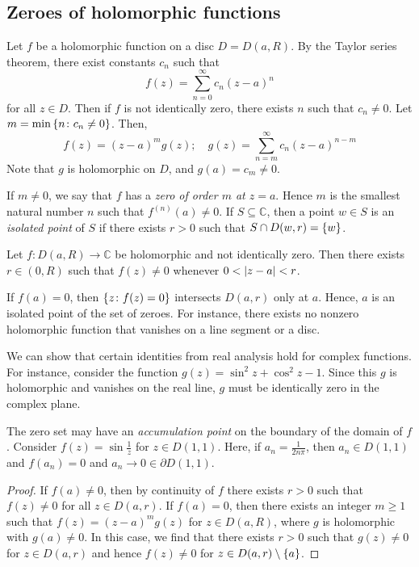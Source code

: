 \subsection{Zeroes of holomorphic functions}
\begin{definition}
	Let \( f \) be a holomorphic function on a disc \( D = D(a,R) \).
	By the Taylor series theorem, there exist constants \( c_n \) such that
	\[
		f(z) = \sum_{n=0}^\infty c_n (z-a)^n
	\]
	for all \( z \in D \).
	Then if \( f \) is not identically zero, there exists \( n \) such that \( c_n \neq 0 \).
	Let \( m = \min \qty{ n \colon c_n \neq 0 } \).
	Then,
	\[
		f(z) = (z-a)^m g(z);\quad g(z) = \sum_{n=m}^\infty c_n (z-a)^{n-m}
	\]
	Note that \( g \) is holomorphic on \( D \), and \( g(a) = c_m \neq 0 \).

	If \( m \neq 0 \), we say that \( f \) has a \textit{zero of order \( m \) at \( z = a \)}.
	Hence \( m \) is the smallest natural number \( n \) such that \( f^{(n)}(a) \neq 0 \).
	If \( S \subseteq \mathbb C \), then a point \( w \in S \) is an \textit{isolated point} of \( S \) if there exists \( r > 0 \) such that \( S \cap D(w,r) = \qty{w} \).
\end{definition}
\begin{theorem}
	Let \( f \colon D(a,R) \to \mathbb C \) be holomorphic and not identically zero.
	Then there exists \( r \in (0,R) \) such that \( f(z) \neq 0 \) whenever \( 0 < \abs{z-a} < r \).
\end{theorem}
\begin{remark}
	If \( f(a) = 0 \), then \( \qty{z \colon f(z) = 0} \) intersects \( D(a,r) \) only at \( a \).
	Hence, \( a \) is an isolated point of the set of zeroes.
	For instance, there exists no nonzero holomorphic function that vanishes on a line segment or a disc.

	We can show that certain identities from real analysis hold for complex functions.
	For instance, consider the function \( g(z) = \sin^2 z + \cos^2 z - 1 \).
	Since this \( g \) is holomorphic and vanishes on the real line, \( g \) must be identically zero in the complex plane.

	The zero set may have an \textit{accumulation point} on the boundary of the domain of \( f \).
	Consider \( f(z) = \sin \frac{1}{z} \) for \( z \in D(1,1) \).
	Here, if \( a_n = \frac{1}{2n \pi} \), then \( a_n \in D(1,1) \) and \( f(a_n) = 0 \) and \( a_n \to 0 \in \partial D(1,1) \).
\end{remark}
\begin{proof}
	If \( f(a) \neq 0 \), then by continuity of \( f \) there exists \( r > 0 \) such that \( f(z) \neq 0 \) for all \( z \in D(a,r) \).
	If \( f(a) = 0 \), then there exists an integer \( m \geq 1 \) such that \( f(z) = (z-a)^m g(z) \) for \( z \in D(a,R) \), where \( g \) is holomorphic with \( g(a) \neq 0 \).
	In this case, we find that there exists \( r > 0 \) such that \( g(z) \neq 0 \) for \( z \in D(a,r) \) and hence \( f(z) \neq 0 \) for \( z \in D(a,r) \setminus \qty{a} \).
\end{proof}

